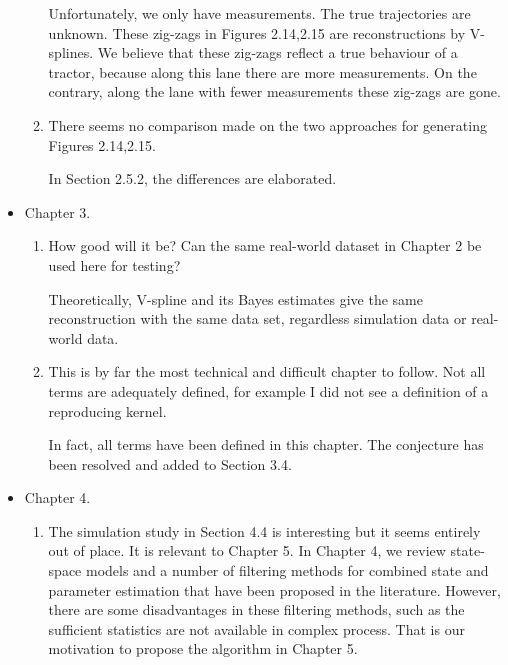 \documentclass[a4paper,18pt]{extarticle}
\begin{document}
\begin{itemize}
\begin{enumerate}
	Unfortunately, we only have measurements. The true trajectories are unknown. These zig-zags in Figures 2.14,2.15 are reconstructions by V-splines. We believe that these zig-zags reflect a true behaviour of a tractor, because along this lane there are more measurements. On the contrary, along the lane with fewer measurements these zig-zags are gone.
	
	\item There seems no comparison made on the two approaches for generating Figures 2.14,2.15.
	
	In Section 2.5.2, the differences are elaborated. 
	
	\end{enumerate}
	
	\item  Chapter 3. 
	
	\begin{enumerate}
	
	\item How good will it be? Can the same real-world dataset in Chapter 2 be used here for testing?
	
	Theoretically, V-spline and its Bayes estimates give the same reconstruction with the same data set, regardless simulation data or real-world data. 

	\item This is by far the most technical and difficult chapter to follow. Not all terms are adequately defined, for example I did not see a definition of a reproducing kernel. 
	
	In fact, all terms have been defined in this chapter. The conjecture has been resolved and added to Section 3.4.
	
	\end{enumerate}
	
	\item  Chapter 4. 
	
	\begin{enumerate}
	
	\item The simulation study in Section 4.4 is interesting but it seems entirely out of place.
	It is relevant to Chapter 5. In Chapter 4, we review state-space models and a number of filtering methods for combined state and parameter estimation that have been proposed in the literature. However, there are some disadvantages in these filtering methods, such as the sufficient statistics are not available in complex process. That is our motivation to propose the algorithm in Chapter 5.
	

\end{enumerate}
\end{itemize}
\end{document}
